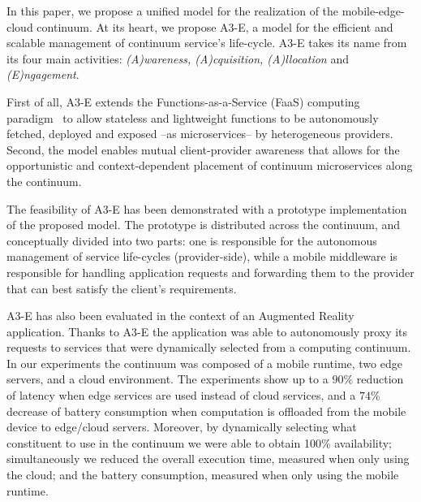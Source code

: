 In this paper, we propose a unified model for the realization of the mobile-edge-cloud continuum. At its heart, we propose A3-E, a model for the efficient and scalable management of continuum service's life-cycle. A3-E takes its name from its four main activities: \textit{(A)wareness, (A)cquisition, (A)llocation} and \textit{(E)ngagement}. 

First of all, A3-E extends the Functions-as-a-Service (FaaS) computing paradigm~\cite{Hendrickson:2016,baldini2017serverless,GarrigaMendonca2017} to allow stateless and lightweight functions to be autonomously fetched, deployed and exposed --as microservices-- by heterogeneous providers. Second, the model enables mutual client-provider awareness that allows for the opportunistic and context-dependent placement of continuum microservices along the continuum. 

The feasibility of A3-E has been demonstrated with a prototype implementation of the proposed model. The prototype is distributed across the continuum, and conceptually divided into two parts: one is responsible for the autonomous management of service life-cycles (provider-side), while a mobile middleware is responsible for handling application requests and forwarding them to the provider that can best satisfy the client's requirements.


A3-E has also been evaluated in the context of an Augmented Reality application. Thanks to A3-E the application was able to autonomously proxy its requests to services that were dynamically selected from a computing continuum. In our experiments the continuum was composed of a mobile runtime, two edge servers, and a cloud environment. The experiments show up to a $90$\% reduction of latency when edge services are used instead of cloud services, and a $74$\% decrease of battery consumption when computation is offloaded from the mobile device to edge/cloud servers. Moreover, by dynamically selecting what constituent to use in the continuum we were able to obtain 100\% availability; simultaneously we reduced the overall execution time, measured when only using the cloud; and the battery consumption, measured when only using the mobile runtime.

